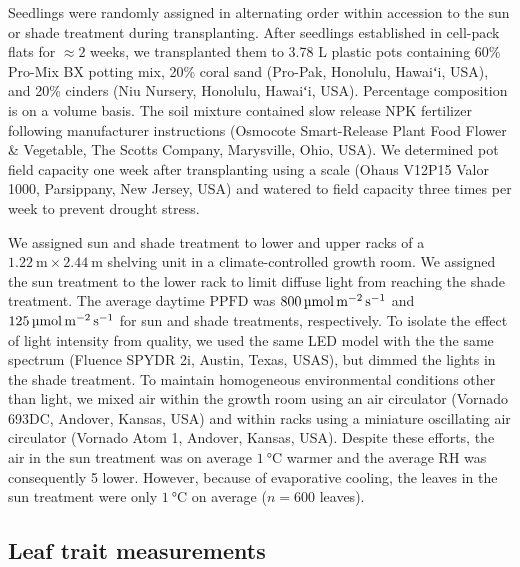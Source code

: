 \documentclass[
  letterpaper,
  DIV=11,
  numbers=noendperiod]{scrartcl}
\newcommand{\ppfd}{$\mathrm{PPFD}$}
\newcommand{\ppfdqty}[1]{$\qty{#1}{\micro\mol\raiseto{-2}\meter\raiseto{-1}\second}$}
\begin{document}
Seedlings were randomly assigned in alternating order within accession
to the sun or shade treatment during transplanting. After seedlings
established in cell-pack flats for \(\approx 2\) weeks, we transplanted
them to 3.78 L plastic pots containing 60\% Pro-Mix BX potting mix, 20\%
coral sand (Pro-Pak, Honolulu, Hawaiʻi, USA), and 20\% cinders (Niu
Nursery, Honolulu, Hawaiʻi, USA). Percentage composition is on a volume
basis. The soil mixture contained slow release NPK fertilizer following
manufacturer instructions (Osmocote Smart-Release Plant Food Flower \&
Vegetable, The Scotts Company, Marysville, Ohio, USA). We determined pot
field capacity one week after transplanting using a scale (Ohaus V12P15
Valor 1000, Parsippany, New Jersey, USA) and watered to field capacity
three times per week to prevent drought stress.

We assigned sun and shade treatment to lower and upper racks of a
\(\qty{1.22}{\meter} \times \qty{2.44}{\meter}\) shelving unit in a
climate-controlled growth room. We assigned the sun treatment to the
lower rack to limit diffuse light from reaching the shade treatment. The
average daytime \ppfd{} was \ppfdqty{800} and \ppfdqty{125} for sun and
shade treatments, respectively. To isolate the effect of light intensity
from quality, we used the same LED model with the the same spectrum
(Fluence SPYDR 2i, Austin, Texas, USAS), but dimmed the lights in the
shade treatment. To maintain homogeneous environmental conditions other
than light, we mixed air within the growth room using an air circulator
(Vornado 693DC, Andover, Kansas, USA) and within racks using a miniature
oscillating air circulator (Vornado Atom 1, Andover, Kansas, USA).
Despite these efforts, the air in the sun treatment was on average
\(\qty{1}{\degreeCelsius}\) warmer and the average RH was consequently 5
lower. However, because of evaporative cooling, the leaves in the sun
treatment were only \(\qty{1}{\degreeCelsius}\) on average (\(n = 600\)
leaves).

\subsection{Leaf trait measurements}\label{leaf-trait-measurements}
\end{document}
